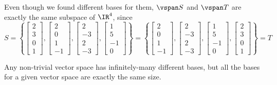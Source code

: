 \begin{applicationActivities}
\begin{observation}
  Even though we found different bases for them,
  \(\vspan S\) and \(\vspan T\) are exactly the same subspace of \(\IR^4\),
  since
  \[
    S=\left\{
    \begin{bmatrix}2\\3\\0\\1\end{bmatrix},
    \begin{bmatrix}2\\0\\1\\-1\end{bmatrix},
    \begin{bmatrix}2\\-3\\2\\-3\end{bmatrix},
    \begin{bmatrix}1\\5\\-1\\0\end{bmatrix}
    \right\}
      =
    \left\{
    \begin{bmatrix}2\\0\\1\\-1\end{bmatrix},
    \begin{bmatrix}2\\-3\\2\\-3\end{bmatrix},
    \begin{bmatrix}1\\5\\-1\\0\end{bmatrix},
    \begin{bmatrix}2\\3\\0\\1\end{bmatrix}
    \right\}=T
  \]
\end{observation}


\begin{fact}
  Any non-trivial vector space has infinitely-many different bases, but all
  the bases for a given vector space are exactly the same size.

  \vspace{1em}


\end{fact}
\end{applicationActivities}
